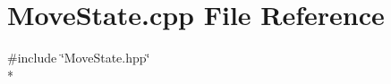 \section{Move\-State.\-cpp File Reference}
\label{_move_state_8cpp}
{\ttfamily \#include \char`\"{}Move\-State.\-hpp\char`\"{}}\\*
